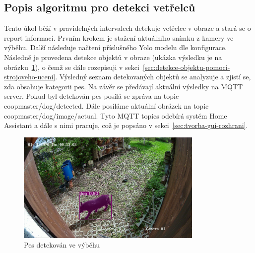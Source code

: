 \subsection*{Popis algoritmu pro detekci vetřelců}
Tento úkol běží v pravidelných intervalech detekuje vetřelce v obraze a stará se o report informací.
Prvním krokem je stažení aktuálního snímku z kamery ve výběhu.
Další následuje načtení příslušného Yolo modelu dle konfigurace.
Následně je provedena detekce objektů v obraze (ukázka výsledku je na obrázku~\ref{fig:dog_detected}), o čemž se dále rozepisuji v sekci~\ref{sec:detekce-objektu-pomoci-strojoveho-uceni}.
Výsledný seznam detekovaných objektů se analyzuje a zjistí se, zda obsahuje kategorii pes.
Na závěr se předávají aktuální výsledky na MQTT server.
Pokud byl detekován pes posílá se zpráva na topic coopmaster/dog/detected.
Dále posíláme aktuální obrázek na topic coopmaster/dog/image/actual.
Tyto MQTT topics odebírá systém Home Assistant a dále s nimi pracuje, což je popsáno v sekci~\ref{sec:tvorba-gui-rozhrani}.

\begin{figure}[H]
    \centering
    \includegraphics[width=0.8\textwidth]{img/dog_detected}
    \caption{Pes detekován ve výběhu}
    \label{fig:dog_detected}
\end{figure}



